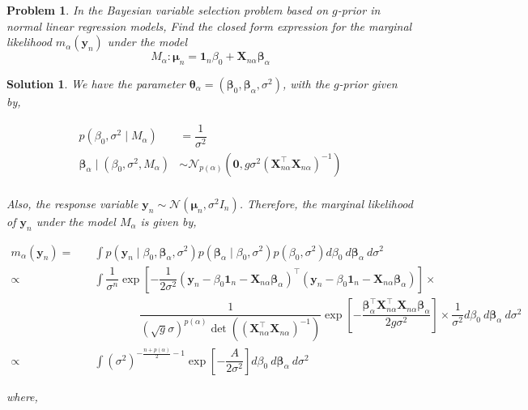 \documentclass[12pt]{article}
\theoremstyle{problemstyle}
\newtheorem{pbm}{Problem}
\newtheorem*{solution*}{Solution}
\newenvironment{problem}{
\begin{tcolorbox}[colback=green!10!white,colframe=black!75!black, parbox = false]\begin{pbm} }{\end{pbm}\end{tcolorbox} }
\newcommand{\normal}{\mathcal{N}}
\newcommand{\bb}[1]{\boldsymbol{#1}}
\newcommand{\transpose}{^\intercal}
\begin{document}
\begin{problem}
    In the Bayesian variable selection problem based on $g$-prior in normal linear regression models, Find the closed form expression for the marginal likelihood $m_\alpha(\bb{y}_n)$ under the model 
    $$
    M_\alpha : \bb{\mu}_n = \bb{1}_n \beta_0 + \bb{X}_{n\alpha} \bb{\beta}_\alpha
    $$
\end{problem}

\begin{solution*}
    We have the parameter $\bb{\theta}_\alpha = (\bb{\beta}_0, \bb{\beta}_\alpha, \sigma^2)$, with the $g$-prior given by,

    \begin{align*}
        p(\beta_0, \sigma^2 \mid M_\alpha) & = \dfrac{1}{\sigma^2}\\
        \bb{\beta}_\alpha \mid (\beta_0, \sigma^2, M_\alpha) & \sim \normal_{p(\alpha)} \left( \bb{0}, g \sigma^2 (\bb{X}_{n\alpha}\transpose \bb{X}_{n\alpha})^{-1} \right)\\
    \end{align*}

    Also, the response variable $\bb{y}_n \sim \normal(\bb{\mu}_n, \sigma^2 I_n)$. Therefore, the marginal likelihood of $\bb{y}_n$ under the model $M_\alpha$ is given by,

    \begin{align*}
        m_\alpha(\bb{y}_n) = \quad & \int p(\bb{y}_n \mid \beta_0, \bb{\beta}_\alpha, \sigma^2) p(\bb{\beta}_{\alpha} \mid \beta_0, \sigma^2) p(\beta_0, \sigma^2) d\beta_0 \ d\bb{\beta}_\alpha \ d\sigma^2\\
        \propto \quad & \int \dfrac{1}{\sigma^n} \exp\left[ -\dfrac{1}{2\sigma^2} (\bb{y}_n - \beta_0 \bb{1}_n - \bb{X}_{n\alpha} \bb{\beta}_{\alpha})\transpose (\bb{y}_n - \beta_0 \bb{1}_n - \bb{X}_{n\alpha} \bb{\beta}_{\alpha}) \right] \times\\
        & \qquad \qquad \dfrac{1}{(\sqrt{g}\sigma)^{p(\alpha)}\det((\bb{X}_{n\alpha}\transpose \bb{X}_{n\alpha})^{-1}) } \exp\left[ -\dfrac{\bb{\beta}_\alpha\transpose \bb{X}_{n\alpha}\transpose \bb{X}_{n\alpha} \bb{\beta}_\alpha}{2g\sigma^2} \right] \times \dfrac{1}{\sigma^2} d\beta_0 \ d\bb{\beta}_\alpha \ d\sigma^2\\
        \propto \quad & \int (\sigma^2)^{-\frac{n + p(\alpha)}{2} - 1} \exp\left[ -\dfrac{A}{2\sigma^2} \right] d\beta_0 \ d\bb{\beta}_\alpha \ d\sigma^2
    \end{align*}

    where,


\end{solution*}
\end{document}
